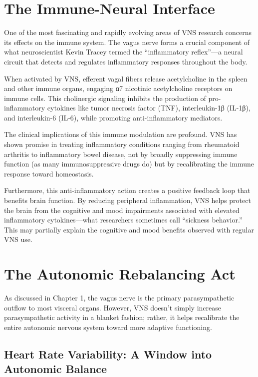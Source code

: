 \documentclass[
  Letterpaper,
]{scrbook}
\begin{document}
\section{The Immune-Neural Interface}\label{the-immune-neural-interface}

One of the most fascinating and rapidly evolving areas of VNS research
concerns its effects on the immune system. The vagus nerve forms a
crucial component of what neuroscientist Kevin Tracey termed the
``inflammatory reflex''---a neural circuit that detects and regulates
inflammatory responses throughout the body.

When activated by VNS, efferent vagal fibers release acetylcholine in
the spleen and other immune organs, engaging α7 nicotinic acetylcholine
receptors on immune cells. This cholinergic signaling inhibits the
production of pro-inflammatory cytokines like tumor necrosis factor
(TNF), interleukin-1β (IL-1β), and interleukin-6 (IL-6), while promoting
anti-inflammatory mediators.

The clinical implications of this immune modulation are profound. VNS
has shown promise in treating inflammatory conditions ranging from
rheumatoid arthritis to inflammatory bowel disease, not by broadly
suppressing immune function (as many immunosuppressive drugs do) but by
recalibrating the immune response toward homeostasis.

Furthermore, this anti-inflammatory action creates a positive feedback
loop that benefits brain function. By reducing peripheral inflammation,
VNS helps protect the brain from the cognitive and mood impairments
associated with elevated inflammatory cytokines---what researchers
sometimes call ``sickness behavior.'' This may partially explain the
cognitive and mood benefits observed with regular VNS use.

\section{The Autonomic Rebalancing
Act}\label{the-autonomic-rebalancing-act}

As discussed in Chapter 1, the vagus nerve is the primary
parasympathetic outflow to most visceral organs. However, VNS doesn't
simply increase parasympathetic activity in a blanket fashion; rather,
it helps recalibrate the entire autonomic nervous system toward more
adaptive functioning.

\subsection{Heart Rate Variability: A Window into Autonomic
Balance}\label{heart-rate-variability-a-window-into-autonomic-balance}
\end{document}
